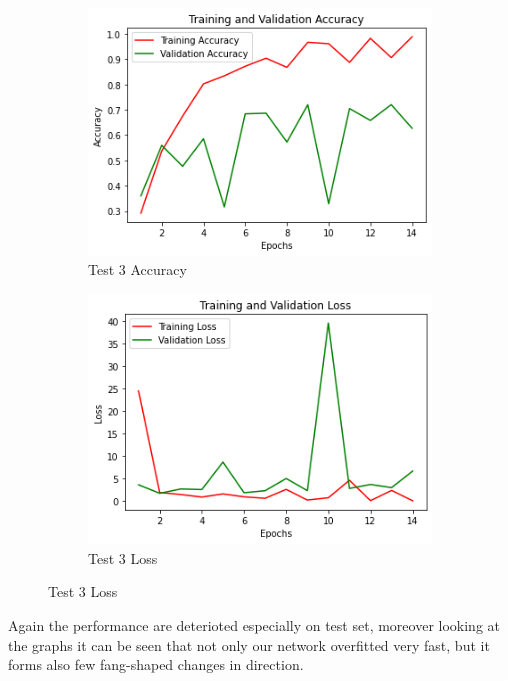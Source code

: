 \begin{figure}[H]
	\begin{subfigure}{0.5\textwidth}
		\includegraphics[width=0.9\linewidth]{img/vgg16/vgg16ft1acc.png} 
		\caption{Test 3 Accuracy}
		\label{fig:vgg16ft1acc}
	\end{subfigure}
	\begin{subfigure}{0.5\textwidth}
		\includegraphics[width=0.9\linewidth]{img/vgg16/vgg16ft1loss.png}
		\caption{Test 3 Loss}
		\label{fig:vgg16ft1loss}
	\end{subfigure}
\end{figure}


Again the performance are deterioted especially on test set, moreover looking at the graphs it can be seen that not only our network overfitted very fast, but it forms also few fang-shaped changes in direction. 






